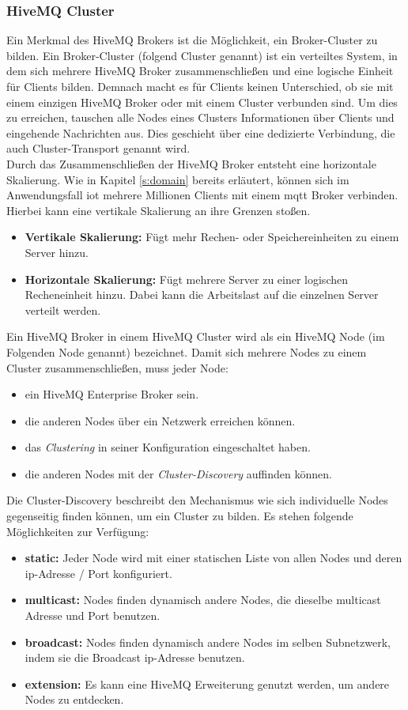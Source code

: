 \subsubsection{HiveMQ Cluster} \label{s:hivemq-cluster}
Ein Merkmal des HiveMQ Brokers ist die Möglichkeit, ein Broker-Cluster zu bilden.
Ein Broker-Cluster (folgend Cluster genannt) ist ein verteiltes System, in dem sich mehrere HiveMQ Broker zusammenschlie{\ss}en und eine logische Einheit für Clients bilden.
Demnach macht es für Clients keinen Unterschied, ob sie mit einem einzigen HiveMQ Broker oder mit einem Cluster verbunden sind.
Um dies zu erreichen, tauschen alle Nodes eines Clusters Informationen über Clients und eingehende Nachrichten aus. Dies geschieht über eine dedizierte Verbindung, die auch Cluster-Transport genannt wird.
\cite{HiveMQClusterHiveMQ}
\\
Durch das Zusammenschlie{\ss}en der HiveMQ Broker entsteht eine horizontale Skalierung. Wie in Kapitel \ref{s:domain} bereits erläutert, können sich im Anwendungsfall \ac{iot} mehrere Millionen Clients mit einem \ac{mqtt} Broker verbinden. Hierbei kann eine vertikale Skalierung an ihre Grenzen sto{\ss}en.
\cite{HowScaleIT}
\begin{itemize}
    \item \textbf{Vertikale Skalierung:} Fügt mehr Rechen- oder Speichereinheiten zu einem Server hinzu.
    \item \textbf{Horizontale Skalierung:} Fügt mehrere Server zu einer logischen Recheneinheit hinzu. Dabei kann die Arbeitslast auf die einzelnen Server verteilt werden.
\end{itemize}
Ein HiveMQ Broker in einem HiveMQ Cluster wird als ein HiveMQ Node (im Folgenden Node genannt) bezeichnet.
Damit sich mehrere Nodes zu einem Cluster zusammenschlie{\ss}en, muss jeder Node:
\begin{itemize}
    \item ein HiveMQ Enterprise Broker sein.
    \item die anderen Nodes über ein Netzwerk erreichen können.
    \item das \textit{Clustering} in seiner Konfiguration eingeschaltet haben.
    \item die anderen Nodes mit der \textit{Cluster-Discovery} auffinden können.
\end{itemize}
Die Cluster-Discovery beschreibt den Mechanismus wie sich individuelle Nodes gegenseitig finden können, um ein Cluster zu bilden. Es stehen folgende Möglichkeiten zur Verfügung:
\begin{itemize}
    \item \textbf{static:} Jeder Node wird mit einer statischen Liste von allen Nodes und deren \acs{ip}-Adresse / Port konfiguriert.
    \item \textbf{multicast:} Nodes finden dynamisch andere Nodes, die dieselbe multicast Adresse und Port benutzen.
    \item \textbf{broadcast:} Nodes finden dynamisch andere Nodes im selben Subnetzwerk, indem sie die Broadcast \acs{ip}-Adresse benutzen.
    \item \textbf{extension:} Es kann eine HiveMQ Erweiterung genutzt werden, um andere Nodes zu entdecken.
\end{itemize}
